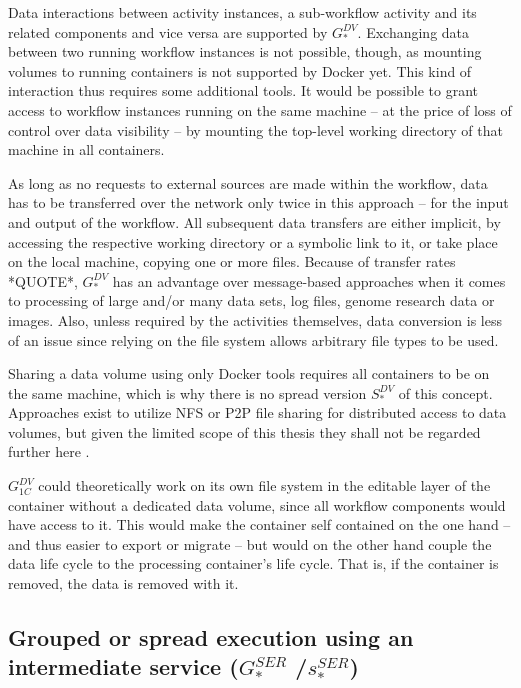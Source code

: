   Data interactions between activity instances, a sub-workflow activity and its related components and vice versa are supported by $G_{*}^{DV}$. Exchanging data between two running workflow instances is not possible, though, as mounting volumes to running containers is not supported by Docker yet. This kind of interaction thus requires some additional tools. It would be possible to grant access to workflow instances running on the same machine -- at the price of loss of control over data visibility -- by mounting the top-level working directory of that machine in all containers.

  As long as no requests to external sources are made within the workflow, data has to be transferred over the network only twice in this approach -- for the input and output of the workflow. All subsequent data transfers are either implicit, \eg by accessing the respective working directory or a symbolic link to it, or take place on the local machine, \eg copying one or more files. Because of transfer rates *QUOTE*, $G_{*}^{DV}$ has an advantage over message-based approaches when it comes to processing of large and/or many data sets, \ie log files, genome research data or images. Also, unless required by the activities themselves, data conversion is less of an issue since relying on the file system allows arbitrary file types to be used.

  Sharing a data volume using only Docker tools requires all containers to be on the same machine, which is why there is no spread version $S_{*}^{DV}$ of this concept. Approaches exist to utilize \ac{NFS} or \ac{P2P} file sharing for distributed access to data volumes, but given the limited scope of this thesis they shall not be regarded further here \cite{Miell2015How}.

  $G_{1C}^{DV}$ could theoretically work on its own file system in the editable layer of the container without a dedicated data volume, since all workflow components would have access to it. This would make the container self contained on the one hand -- and thus easier to export or migrate -- but would on the other hand couple the data life cycle to the processing container's life cycle. That is, if the container is removed, the data is removed with it.


\subsection[Grouped or spread execution using an intermediate service]{Grouped or spread execution using an intermediate service ($G_{*}^{SER}$ /$s_{*}^{SER}$)} %
\label{sub:grouped_execution_using_a_intermediate_service}

